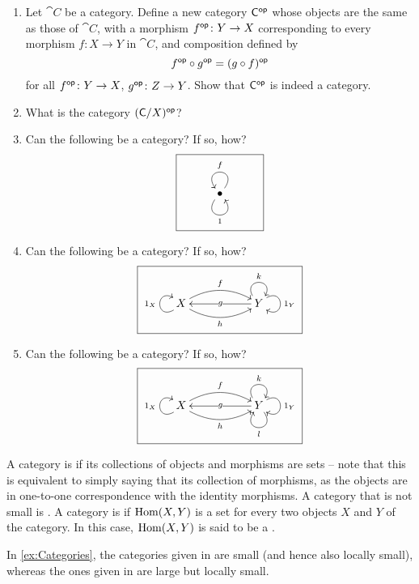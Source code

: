 \begin{Exercise}
\begin{enumerate}
\item Let $\cat C$ be a category. Define a new category $\mathsf{C}^\mathsf{op}$ whose objects are the same as those of $\cat C$, with a morphism $f^\mathsf{op} \colon Y \to X$ corresponding to every morphism $f \colon X \to Y$ in $\cat C$, and composition defined by
\begin{equation*}
f^\mathsf{op} \circ g^\mathsf{op} = (g \circ f)^\mathsf{op}
\end{equation*}
for all $f^\mathsf{op} \colon Y \to X$, $g^\mathsf{op} \colon Z \to Y$. Show that $\mathsf{C}^\mathsf{op}$ is indeed a category.

\item What is the category $(\mathsf{C} / X)^\mathsf{op}$?

\item Can the following be a category? If so, how?
\begin{equation*}
\boxed{\xymatrix{
	& \bullet \ar @(ru, lu)_f \ar @(ld, rd)_1 &
}
}
\end{equation*}

\item Can the following be a category? If so, how?
\begin{equation*}
\boxed{\xymatrix{
	X \ar @(ld, lu)^{1_X} \ar  @/^1pc/[rr]^f  \ar  @/_1pc/[rr]_h && Y \ar @(ul, ur)^k \ar @(ur, dr)^{1_Y} \ar[ll]|-g
}}
\end{equation*}

\item Can the following be a category? If so, how?
\begin{equation*}
\boxed{\xymatrix{
	X \ar @(ld, lu)^{1_X} \ar  @/^1pc/[rr]^f  \ar  @/_1pc/[rr]_h && Y \ar @(ul, ur)^k \ar @(ur, dr)^{1_Y} \ar @(dr, dl)^l \ar[ll]|-g
}}
\end{equation*}
\end{enumerate}
\end{Exercise}

A category is  if its collections of objects and morphisms are sets -- note that this is equivalent to simply saying that its collection of morphisms, as the objects are in one-to-one correspondence with the identity morphisms. A category that is not small is . A category is  if $\operatorname{Hom}(X, Y)$ is a set for every two objects $X$ and $Y$ of the category. In this case, $\operatorname{Hom}(X, Y)$ is said to be a .

In \cref{ex:Categories}, the categories given in  are small (and hence also locally small), whereas the ones given in  are large but locally small.

